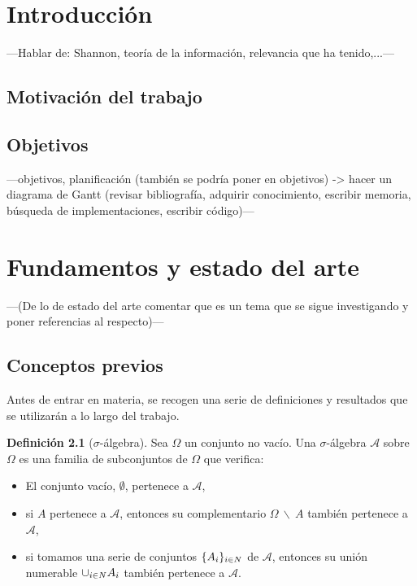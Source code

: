 \documentclass[12pt,a4paper]{report} %
\let\mathbb\relax
\theoremstyle{definition}
\newtheorem{definition}{Definición}[section]
\begin{document}
\tableofcontents
\newpage

\chapter{Introducción}

---Hablar de: Shannon, teoría de la información, relevancia que ha tenido,...---
\section{Motivación del trabajo}
\section{Objetivos}
---objetivos, planificación (también se podría poner en objetivos) -> hacer un diagrama de Gantt (revisar bibliografía, adquirir conocimiento, escribir memoria, búsqueda de implementaciones, escribir código)---

\chapter{Fundamentos y estado del arte}

---(De lo de estado del arte comentar que es un tema que se sigue investigando y poner referencias al respecto)---

\section{Conceptos previos}

Antes de entrar en materia, se recogen una serie de definiciones y resultados que se utilizarán a lo largo del trabajo.\\

\begin{definition}[$\sigma$-álgebra]
  Sea $\Omega$ un conjunto no vacío. Una $\sigma$-álgebra $\mathcal{A}$ sobre $\Omega$ es una familia de subconjuntos de $\Omega$ que verifica:
  \begin{itemize}
  \item  El conjunto vacío, $\emptyset$, pertenece a $\mathcal{A}$,
  \item  si $A$ pertenece a $\mathcal{A}$, entonces su complementario $\Omega\ \backslash\ A$ también pertenece a $\mathcal{A}$,
 \item si tomamos una serie de conjuntos $\{A_i\}_{i\in \mathbb{N}}$ de $\mathcal{A}$, entonces su unión numerable $\cup_{i\in \mathbb{N}}A_i$ también pertenece a $\mathcal{A}$.\\
  \end{itemize}
  
\end{definition}
\end{document}
